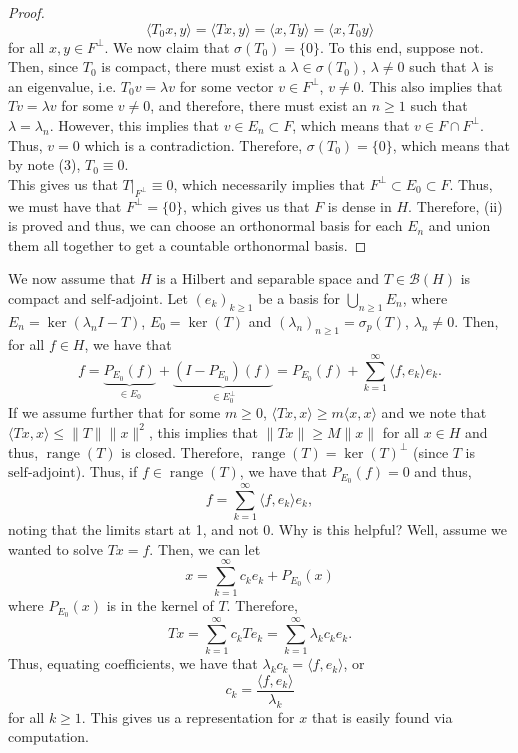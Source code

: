\documentclass[12pt]{article}
\newcommand{\B}{\mathscr{B}}
\newcommand{\la}{\langle}
\newcommand{\ra}{\rangle}
\DeclareMathOperator{\range}{range}
\newcommand{\sbs}{\subset}
\newcommand{\saj}{\text{self-adjoint}}
\begin{document}
\begin{proof}
\[ \la T_0 x, y \ra = \la Tx , y \ra = \la x, Ty \ra = \la x, T_0 y \ra\]
for all $x, y \in F^{\perp}$. We now claim that $\sigma(T_0) = \{ 0 \}$. To this end, suppose not. Then, since $T_0$ is compact, there must exist a $\lambda \in \sigma(T_0)$, $\lambda \neq 0$ such that $\lambda$ is an eigenvalue, i.e. $T_0 v = \lambda v$ for some vector $v \in F^{\perp}$, $v \neq 0$. This also implies that $Tv = \lambda v$ for some $v \neq 0$, and therefore, there must exist an $n \geq 1$ such that $\lambda = \lambda_n$. However, this implies that $v \in E_n \sbs F$, which means that $v \in F \cap F^{\perp}$. Thus, $v = 0$ which is a contradiction. Therefore, $\sigma(T_0) = \{ 0 \}$, which  means that by note (3), $T_0 \equiv 0$. \\
\indent This gives us that $T \vert_{F^{\perp}} \equiv 0$, which necessarily implies that $F^{\perp} \sbs E_0 \sbs F$. Thus, we must have that $F^{\perp} = \{ 0 \}$, which gives us that $F$ is dense in $H$. Therefore, (ii) is proved and thus, we can choose an orthonormal basis for each $E_n$ and union them all together to get a countable orthonormal basis. 
\end{proof}
\vspace{-25pt}
We now assume that $H$ is a Hilbert and separable space and $T \in \B(H)$ is compact and $\saj$. Let $(e_k)_{k \geq 1}$ be a basis for $\bigcup\limits_{n \geq 1} E_n$, where $E_n = \ker(\lambda_n I - T)$, $E_0 = \ker(T)$ and $(\lambda_n)_{n \geq 1} = \sigma_p(T)$, $\lambda_n \neq 0$. Then, for all $f \in H$, we have that 
\[f = \underbrace{P_{E_0}(f)}_{\in E_0} + \underbrace{( I - P_{E_0})(f)}_{\in E_0^{\perp}} = P_{E_0}(f) + \sum\limits_{k = 1}^{\infty} \la f, e_k \ra e_k.\]
If we assume further that for some $m \geq 0$, $\la Tx, x \ra \geq m\la x, x \ra$ and we note that $\la Tx, x \ra \leq \| T \| \| x \|^2$, this implies that $\| Tx \| \geq M \| x\|$ for all $x \in H$ and thus, $\range(T)$ is closed. Therefore, $\range(T) = \ker(T)^{\perp}$ (since $T$ is $\saj$). Thus, if $f \in \range(T)$, we have that $P_{E_0}(f) = 0$ and thus, 
\[ f = \sum\limits_{k = 1}^{\infty} \la f, e_k \ra e_k, \]
noting that the limits start at 1, and not 0. Why is this helpful? Well, assume we wanted to solve $Tx = f$. Then, we can let 
\[ x = \sum\limits_{k = 1}^{\infty} c_k e_k + P_{E_0} (x)\]
where $ P_{E_0} (x)$ is in the kernel of $T$. Therefore, 
\[ Tx = \sum\limits_{k = 1}^{\infty} c_k T e_k = \sum\limits_{k = 1}^{\infty} \lambda_k c_k e_k.\]
Thus, equating coefficients, we have that $\lambda_k c_k = \la f, e_k \ra$, or 
\[ c_k = \frac{\la f, e_k \ra}{\lambda_k}\]
for all $k \geq 1$. This gives us a representation for $x$ that is easily found via computation.
\end{document}
